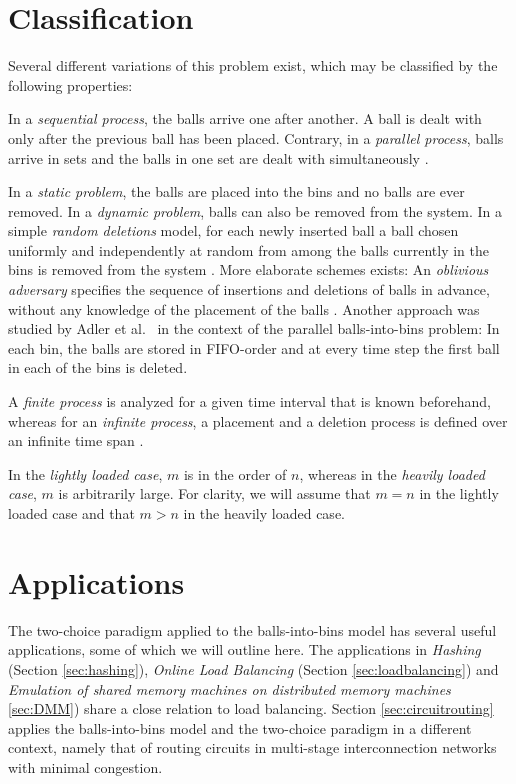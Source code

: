 \documentclass[a4paper,12pt]{article}
\begin{document}
\section{Classification}
\label{sec:classification}
Several different variations of this problem exist, which may be classified by the following properties:
\begin{compactitem}
\item In a \emph{sequential process}, the balls arrive one after another. A  ball is dealt with only after the previous ball has been placed. Contrary, in a \emph{parallel process}, balls arrive in sets and the balls in one set are dealt with simultaneously \cite{ABS98}. 
\item In a \emph{static problem}, the balls are placed into the bins and no balls are ever removed. In a \emph{dynamic problem}, balls can also be removed from the system. In a simple \emph{random deletions} model, for each newly inserted ball a ball chosen uniformly and independently at random from among the balls currently in the bins is removed from the system \cite{ABKU99} \cite{MRS01}. More elaborate schemes exists: An \emph{oblivious adversary} specifies the sequence of insertions and deletions of balls in advance, without any knowledge of the placement of the balls \cite{CFM+98}. Another approach was studied by Adler et al.~\cite{ABS98} in the context of the parallel balls-into-bins problem: In each bin, the balls are stored in FIFO-order and at every time step the first ball in each of the bins is deleted. 
\item A \emph{finite process} is analyzed for a given time interval that is known beforehand, whereas for an \emph{infinite process}, a placement and a deletion process is defined over an infinite time span \cite{ABS98}.
\item In the \emph{lightly loaded case}, $m$ is in the order of $n$, whereas in the \emph{heavily loaded case}, $m$ is arbitrarily large. For clarity, we will assume that $m = n$ in the lightly loaded case and that $m > n$ in the heavily loaded case. 
\end{compactitem}

\section{Applications}
\label{sec:applications}
The two-choice paradigm applied to the balls-into-bins model has several useful applications, some of which we will outline here. The applications in \emph{Hashing} (Section \ref{sec:hashing}), \emph{Online Load Balancing} (Section \ref{sec:loadbalancing}) and \emph{Emulation of shared memory machines on distributed memory machines} \ref{sec:DMM}) share a close relation to load balancing. Section \ref{sec:circuitrouting} applies the balls-into-bins model and the two-choice paradigm in a different context, namely that of routing circuits in multi-stage interconnection networks with minimal congestion.
\end{document}
